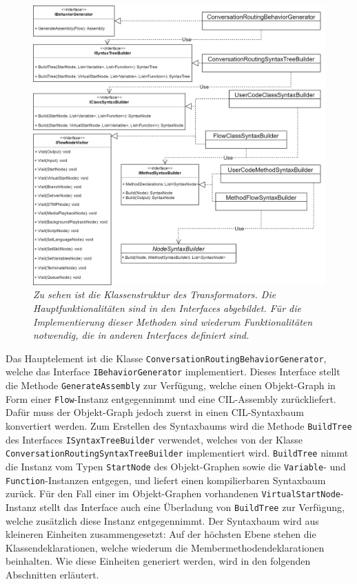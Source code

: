 \begin{figure} %
	\centering
		\includegraphics[width=\textwidth]{img/TransformatorUML.png}
	\caption[Klassenstruktur des Transformators]{\textit{Zu sehen ist die Klassenstruktur des Transformators. Die Hauptfunktionalitäten sind in den Interfaces abgebildet. Für die Implementierung dieser Methoden sind wiederum Funktionalitäten notwendig, die in anderen Interfaces definiert sind.}}
	\label{fig:UML:Transformator}
\end{figure}
\noindent Das Hauptelement ist die Klasse \texttt{ConversationRoutingBehaviorGenerator}, welche das Interface \texttt{IBehaviorGenerator} implementiert. Dieses Interface stellt die Methode \texttt{GenerateAssembly} zur Verfügung, welche einen Objekt-Graph in Form einer \texttt{Flow}-Instanz entgegennimmt und eine CIL-Assembly zurückliefert.  Dafür muss der Objekt-Graph jedoch zuerst in einen CIL-Syntaxbaum konvertiert werden. Zum Erstellen des Syntaxbaums wird die Methode \texttt{BuildTree} des Interfaces \texttt{ISyntaxTreeBuilder} verwendet, welches von der Klasse \texttt{Con\-ver\-sa\-tion\-Rou\-ting\-Syn\-tax\-Tree\-Buil\-der} implementiert wird. \texttt{BuildTree} nimmt die Instanz vom Typen \texttt{StartNode} des Objekt-Graphen sowie die \texttt{Variable}- und \texttt{Function}-Instanzen entgegen, und liefert einen kompilierbaren Syntaxbaum zurück. Für den Fall einer im Objekt-Graphen vorhandenen \texttt{Vir\-tu\-al\-Start\-Node}-Instanz stellt das Interface auch eine Überladung von \texttt{Build\-Tree} zur Verfügung, welche zusätzlich diese Instanz entgegennimmt. Der Syntaxbaum wird aus kleineren Einheiten zusammengesetzt: Auf der höchsten Ebene stehen die Klassendeklarationen, welche wiederum die Membermethodendeklarationen beinhalten. Wie diese Einheiten generiert werden, wird in den folgenden Abschnitten erläutert.

